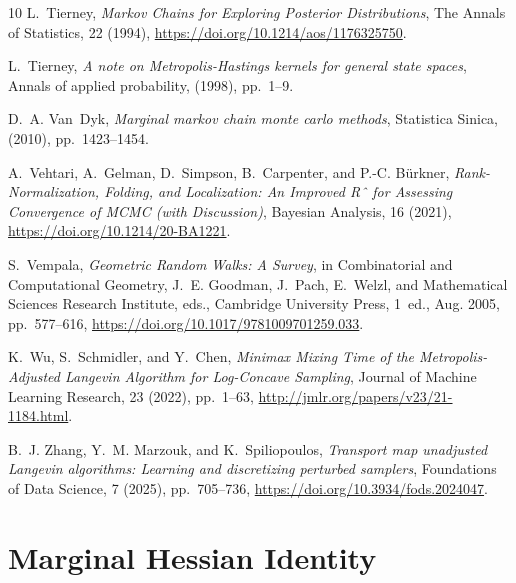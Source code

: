 \documentclass[onefignum,onetabnum]{siamonline250211}
\begin{document}
\begin{thebibliography}{10}
{\sc L.~Tierney}, {\em Markov {Chains} for {Exploring} {Posterior}
  {Distributions}}, The Annals of Statistics, 22 (1994),
  \url{https://doi.org/10.1214/aos/1176325750}.

{\sc L.~Tierney}, {\em A note on {Metropolis}-{Hastings} kernels for general
  state spaces}, Annals of applied probability,  (1998), pp.~1--9.

{\sc D.~A. Van~Dyk}, {\em Marginal markov chain monte carlo methods},
  Statistica Sinica,  (2010), pp.~1423--1454.

{\sc A.~Vehtari, A.~Gelman, D.~Simpson, B.~Carpenter, and P.-C. Bürkner}, {\em
  Rank-{Normalization}, {Folding}, and {Localization}: {An} {Improved} {Rˆ}
  for {Assessing} {Convergence} of {MCMC} (with {Discussion})}, Bayesian
  Analysis, 16 (2021), \url{https://doi.org/10.1214/20-BA1221}.

{\sc S.~Vempala}, {\em Geometric {Random} {Walks}: {A} {Survey}}, in
  Combinatorial and {Computational} {Geometry}, J.~E. Goodman, J.~Pach,
  E.~Welzl, and {Mathematical Sciences Research Institute}, eds., Cambridge
  University Press, 1~ed., Aug. 2005, pp.~577--616,
  \url{https://doi.org/10.1017/9781009701259.033}.

{\sc K.~Wu, S.~Schmidler, and Y.~Chen}, {\em Minimax {Mixing} {Time} of the
  {Metropolis}-{Adjusted} {Langevin} {Algorithm} for {Log}-{Concave}
  {Sampling}}, Journal of Machine Learning Research, 23 (2022), pp.~1--63,
  \url{http://jmlr.org/papers/v23/21-1184.html}.

{\sc B.~J. Zhang, Y.~M. Marzouk, and K.~Spiliopoulos}, {\em Transport map
  unadjusted {Langevin} algorithms: {Learning} and discretizing perturbed
  samplers}, Foundations of Data Science, 7 (2025), pp.~705--736,
  \url{https://doi.org/10.3934/fods.2024047}.

\end{thebibliography}
%

\appendix
%
%
\section{Marginal Hessian Identity}
\label{appendix:marginal-hessian-identity}
\end{document}

